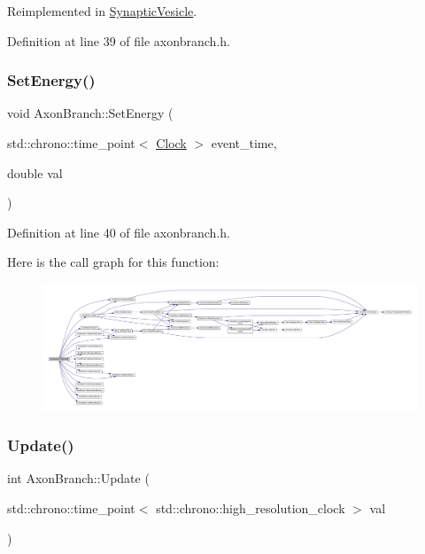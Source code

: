 Reimplemented in \hyperlink{class_synaptic_vesicle_a7fd7cfce5eccb904206d968866f85220}{Synaptic\+Vesicle}.



Definition at line 39 of file axonbranch.\+h.

\mbox{\label{class_axon_branch_a6918dcaf6d9325a1a22a2e6c65ad5dab}} 
\subsubsection{\texorpdfstring{Set\+Energy()}{SetEnergy()}}
{\footnotesize\ttfamily void Axon\+Branch\+::\+Set\+Energy (\begin{DoxyParamCaption}\item[{std\+::chrono\+::time\+\_\+point$<$ \hyperlink{universe_8h_a0ef8d951d1ca5ab3cfaf7ab4c7a6fd80}{Clock} $>$}]{event\+\_\+time,  }\item[{double}]{val }\end{DoxyParamCaption})\hspace{0.3cm}{\ttfamily [inline]}}



Definition at line 40 of file axonbranch.\+h.

Here is the call graph for this function\+:
\nopagebreak
\begin{figure}[H]
\begin{center}
\leavevmode
\includegraphics[width=350pt]{class_axon_branch_a6918dcaf6d9325a1a22a2e6c65ad5dab_cgraph}
\end{center}
\end{figure}
\mbox{\label{class_axon_branch_a5a80bcccdc2be9f77fca25131937b52f}} 
\subsubsection{\texorpdfstring{Update()}{Update()}}
{\footnotesize\ttfamily int Axon\+Branch\+::\+Update (\begin{DoxyParamCaption}\item[{std\+::chrono\+::time\+\_\+point$<$ std\+::chrono\+::high\+\_\+resolution\+\_\+clock $>$}]{val }\end{DoxyParamCaption})}



